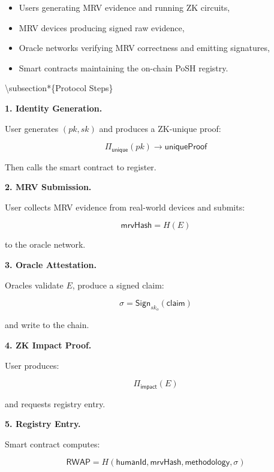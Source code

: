 \documentclass{article}
\begin{document}
\begin{itemize}
\item Users generating MRV evidence and running ZK circuits,
\item MRV devices producing signed raw evidence,
\item Oracle networks verifying MRV correctness and emitting signatures,
\item Smart contracts maintaining the on-chain PoSH registry.
\end{itemize}

{\textbackslash}subsection*\{Protocol Steps\}

\textbf{1. Identity Generation.}

User generates $(pk, sk)$ and produces a ZK-unique proof:

\begin{equation}
\Pi_{\textsf{unique}}(pk) \rightarrow \mathsf{uniqueProof}
\end{equation}

Then calls the smart contract to register.

\textbf{2. MRV Submission.}

User collects MRV evidence from real-world devices and submits:

\begin{equation}
\mathsf{mrvHash} = H(E)
\end{equation}

to the oracle network.

\textbf{3. Oracle Attestation.}

Oracles validate $E$, produce a signed claim:

\begin{equation}
\sigma = \mathsf{Sign}_{sk_o}(\mathsf{claim})
\end{equation}

and write to the chain.

\textbf{4. ZK Impact Proof.}

User produces:

\begin{equation}
\Pi_{\textsf{impact}}(E)
\end{equation}

and requests registry entry.

\textbf{5. Registry Entry.}

Smart contract computes:

\begin{equation}
\mathsf{RWAP} = H(\mathsf{humanId}, \mathsf{mrvHash}, \mathsf{methodology}, \sigma)
\end{equation}
\end{document}
